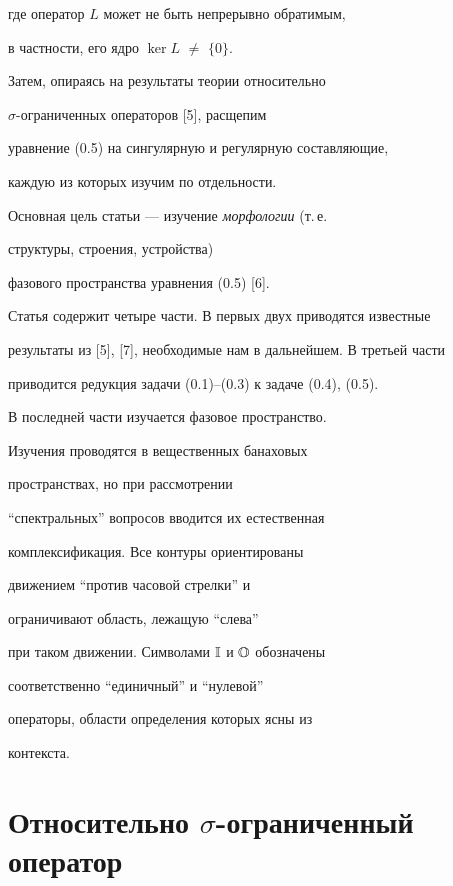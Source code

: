 где оператор $L$ может не быть непрерывно обратимым, 


в частности, его ядро $\ker L$ ${\neq}$ $\{ 0 \}$.


Затем, опираясь на результаты теории относительно


$\sigma$-ограниченных операторов [5], расщепим


уравнение (0.5) на сингулярную и регулярную составляющие, 


каждую из которых изучим по отдельности.


Основная цель статьи --- изучение {\it морфологии}  (т.\,е. 


структуры, строения, устройства)


фазового пространства уравнения (0.5) [6].





Статья содержит четыре части. В первых двух приводятся известные


результаты из [5], [7], необходимые нам в дальнейшем. В третьей части


приводится редукция задачи (0.1)--(0.3) к задаче (0.4), (0.5).


В последней части изучается фазовое пространство.





Изучения проводятся в вещественных банаховых


пространствах, но при рассмотрении


``спектральных'' вопросов вводится их естественная


комплексификация. Все контуры ориентированы 


движением ``против часовой стрелки'' и


ограничивают область, лежащую ``слева''


при таком движении. Символами ${\Bbb I}$ и ${\Bbb O}$ обозначены


соответственно ``единичный'' и ``нулевой''


операторы, области определения которых ясны из


контекста.





\section{Относительно $\sigma$-ограниченный оператор}





